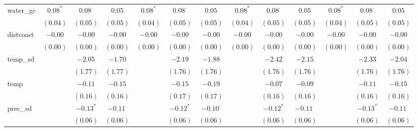 \begin{sidewaystable}
\begin{center}
{\begin{tabular}{l c c c c c c c c c c c c}
water\_gc           & $0.08^{*}$    & $0.08^{\cdot}$  & $0.05$          & $0.08^{*}$    & $0.08^{\cdot}$  & $0.05$          & $0.08^{*}$      & $0.08^{\cdot}$  & $0.05$          & $0.08^{*}$      & $0.08^{\cdot}$  & $0.05$          \\
                    & $(0.04)$      & $(0.05)$        & $(0.05)$        & $(0.04)$      & $(0.05)$        & $(0.05)$        & $(0.04)$        & $(0.05)$        & $(0.05)$        & $(0.04)$        & $(0.05)$        & $(0.05)$        \\
distcoast           & $-0.00$       & $-0.00$         & $-0.00$         & $-0.00$       & $-0.00$         & $-0.00$         & $-0.00$         & $-0.00$         & $-0.00$         & $-0.00$         & $-0.00$         & $-0.00$         \\
                    & $(0.00)$      & $(0.00)$        & $(0.00)$        & $(0.00)$      & $(0.00)$        & $(0.00)$        & $(0.00)$        & $(0.00)$        & $(0.00)$        & $(0.00)$        & $(0.00)$        & $(0.00)$        \\
temp\_sd            &               & $-2.05$         & $-1.70$         &               & $-2.19$         & $-1.88$         &                 & $-2.42$         & $-2.15$         &                 & $-2.33$         & $-2.04$         \\
                    &               & $(1.77)$        & $(1.77)$        &               & $(1.76)$        & $(1.76)$        &                 & $(1.76)$        & $(1.76)$        &                 & $(1.76)$        & $(1.76)$        \\
temp                &               & $-0.11$         & $-0.15$         &               & $-0.15$         & $-0.19$         &                 & $-0.07$         & $-0.09$         &                 & $-0.11$         & $-0.15$         \\
                    &               & $(0.16)$        & $(0.16)$        &               & $(0.17)$        & $(0.17)$        &                 & $(0.16)$        & $(0.16)$        &                 & $(0.16)$        & $(0.16)$        \\
prec\_sd            &               & $-0.13^{*}$     & $-0.11^{\cdot}$ &               & $-0.12^{*}$     & $-0.10^{\cdot}$ &                 & $-0.12^{*}$     & $-0.11^{\cdot}$ &                 & $-0.13^{*}$     & $-0.11^{\cdot}$ \\
                    &               & $(0.06)$        & $(0.06)$        &               & $(0.06)$        & $(0.06)$        &                 & $(0.06)$        & $(0.06)$        &                 & $(0.06)$        & $(0.06)$        \\

\end{tabular}}
\end{center}
\end{sidewaystable}
